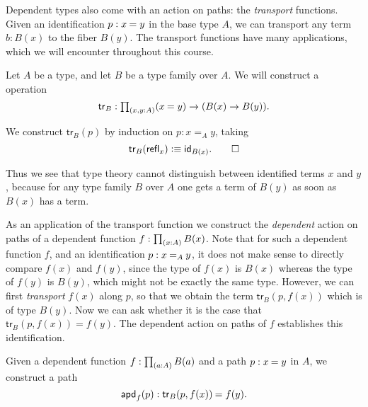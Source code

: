 Dependent types also come with an action on paths: the \emph{transport} functions.
Given an identification $p:\id{x}{y}$ in the base type $A$, we can transport any term $b:B(x)$ to the fiber $B(y)$.
The transport functions have many applications, which we will encounter throughout this course.

\begin{defn}
Let $A$ be a type, and let $B$ be a type family over $A$.
We will construct a  operation
\begin{equation*}
\mathsf{tr}_B:\prd*{x,y:A} (\id{x}{y})\to (B(x)\to B(y)).
\end{equation*}
\end{defn}

\begin{constr}
We construct $\mathsf{tr}_B(p)$ by induction on $p:x=_A y$, taking
\begin{equation*}
\mathsf{tr}_B(\refl{x}) \defeq \idfunc[B(x)].\qedhere
\end{equation*}
\end{constr}

Thus we see that type theory cannot distinguish between identified terms $x$ and $y$, because for any type family $B$ over $A$ one gets a term of $B(y)$ as soon as $B(x)$ has a term.

As an application of the transport function we construct the \emph{dependent} action on paths of a dependent function $f:\prd{x:A}B(x)$. Note that for such a dependent function $f$, and an identification $p:\id[A]{x}{y}$, it does not make sense to directly compare $f(x)$ and $f(y)$, since the type of $f(x)$ is $B(x)$ whereas the type of $f(y)$ is $B(y)$, which might not be exactly the same type. However, we can first \emph{transport} $f(x)$ along $p$, so that we obtain the term $\mathsf{tr}_B(p,f(x))$ which is of type $B(y)$. Now we can ask whether it is the case that $\mathsf{tr}_B(p,f(x))=f(y)$. The dependent action on paths of $f$ establishes this identification.

\begin{defn}\label{defn:apd}
Given a dependent function $f:\prd{a:A}B(a)$ and a path $p:\id{x}{y}$ in $A$, we construct a path
\begin{equation*}
\apd{f}{p} : \id{\mathsf{tr}_B(p,f(x))}{f(y)}.
\end{equation*}
\end{defn}

